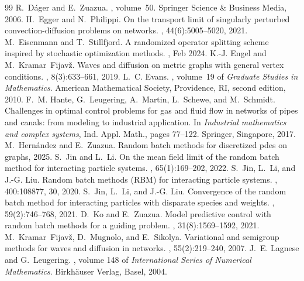 \documentclass[10pt,a4paper]{amsart}
\begin{document}
\begin{thebibliography}{99}
 R.~D{\'a}ger and E.~Zuazua. , volume~50. \newblock Springer Science \& Business Media, 2006.
 H.~Egger and N.~Philippi. \newblock On the transport limit of singularly perturbed convection-diffusion problems on networks. , 44(6):5005--5020, 2021.
 M.~Eisenmann and T.~Stillfjord. \newblock A randomized operator splitting scheme inspired by stochastic optimization methods. , Feb 2024.
 K.-J. Engel and M.~Kramar~Fijav\v{z}. \newblock Waves and diffusion on metric graphs with general vertex conditions. , 8(3):633--661, 2019.
 L.~C. Evans. , volume~19 of {\em Graduate Studies in Mathematics}. \newblock American Mathematical Society, Providence, RI, second edition, 2010.
 F.~M. Hante, G.~Leugering, A.~Martin, L.~Schewe, and M.~Schmidt. \newblock Challenges in optimal control problems for gas and fluid flow in networks of pipes and canals: from modeling to industrial application. \newblock In {\em Industrial mathematics and complex systems}, Ind. Appl. Math., pages 77--122. Springer, Singapore, 2017.
 M.~Hernández and E.~Zuazua. \newblock Random batch methods for discretized pdes on graphs, 2025.
 S.~Jin and L.~Li. \newblock On the mean field limit of the random batch method for interacting particle systems. , 65(1):169--202, 2022.
 S.~Jin, L.~Li, and J.-G. Liu. \newblock Random batch methods ({RBM}) for interacting particle systems. , 400:108877, 30, 2020.
 S.~Jin, L.~Li, and J.-G. Liu. \newblock Convergence of the random batch method for interacting particles with disparate species and weights. , 59(2):746--768, 2021.
 D.~Ko and E.~Zuazua. \newblock Model predictive control with random batch methods for a guiding problem. , 31(8):1569--1592, 2021.
 M.~Kramar~Fijav\v{z}, D.~Mugnolo, and E.~Sikolya. \newblock Variational and semigroup methods for waves and diffusion in networks. , 55(2):219--240, 2007.
 J.~E. Lagnese and G.~Leugering. , volume 148 of {\em International Series of Numerical Mathematics}. \newblock Birkh\"auser Verlag, Basel, 2004.

\end{thebibliography}
\end{document}
